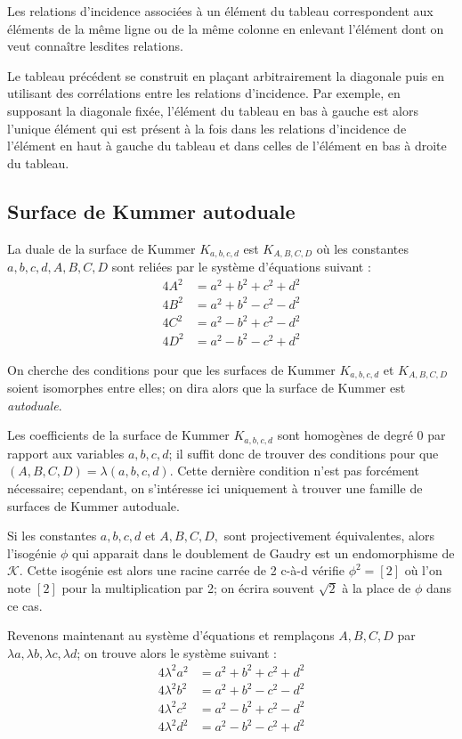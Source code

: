 \documentclass[a4paper]{article}
\theoremstyle{definition}
\theoremstyle{remark}
\numberwithin{equation}{section}
\begin{document}
Les relations d'incidence associées à un élément du tableau correspondent aux éléments de la même ligne ou de la même colonne en enlevant l'élément dont on veut connaître lesdites relations.

Le tableau précédent se construit en plaçant arbitrairement la diagonale puis en utilisant des corrélations entre les relations d'incidence. Par exemple, en supposant la diagonale fixée, l'élément du tableau en bas à gauche est alors l'unique élément qui est présent à la fois dans les relations d'incidence de l'élément en haut à gauche du tableau et dans celles de l'élément en bas à droite du tableau.

\subsection{Surface de Kummer autoduale}
La duale de la surface de Kummer $K_{a,b,c,d}$ est $K_{A,B,C,D}$ où les constantes $a,b,c,d,A,B,C,D$ sont reliées par le système d'équations suivant \citep{gaudry} :
\begin{align*}
4A^2 &= a^2 + b^2 + c^2 + d^2 \\
4B^2 &= a^2 + b^2 - c^2 - d^2 \\
4C^2 &= a^2 - b^2 + c^2 - d^2 \\
4D^2 &= a^2 - b^2 - c^2 + d^2
\end{align*}

On cherche des conditions pour que les surfaces de Kummer $K_{a,b,c,d}$ et $K_{A,B,C,D}$ soient isomorphes entre elles; on dira alors que la surface de Kummer est \emph{autoduale}. 

Les coefficients de la surface de Kummer $K_{a,b,c,d}$ sont homogènes de degré 0 par rapport aux variables $a,b,c,d$; il suffit donc de trouver des conditions pour que $(A,B,C,D)=\lambda(a,b,c,d)$. Cette dernière condition n'est pas forcément nécessaire; cependant, on s'intéresse ici uniquement à trouver une famille de surfaces de Kummer autoduale.

Si les constantes $a,b,c,d$ et $A,B,C,D,$ sont projectivement équivalentes, alors l'isogénie $\phi$ qui apparait dans le doublement de Gaudry est un endomorphisme de $\mathcal{K}$. Cette isogénie est alors une racine carrée de 2 c-à-d vérifie $\phi^2 = [2]$ où l'on note $[2]$ pour la multiplication par 2; on écrira souvent $\sqrt{2}$ à la place de $\phi$ dans ce cas.

Revenons maintenant au système d'équations et remplaçons $A,B,C,D$ par $\lambda a,\lambda b,\lambda c,\lambda d$; on trouve alors le système suivant :
\begin{align*}
4\lambda^2a^2 &= a^2 + b^2 + c^2 + d^2 \\
4\lambda^2b^2 &= a^2 + b^2 - c^2 - d^2 \\
4\lambda^2c^2 &= a^2 - b^2 + c^2 - d^2 \\
4\lambda^2d^2 &= a^2 - b^2 - c^2 + d^2
\end{align*}
\end{document}
